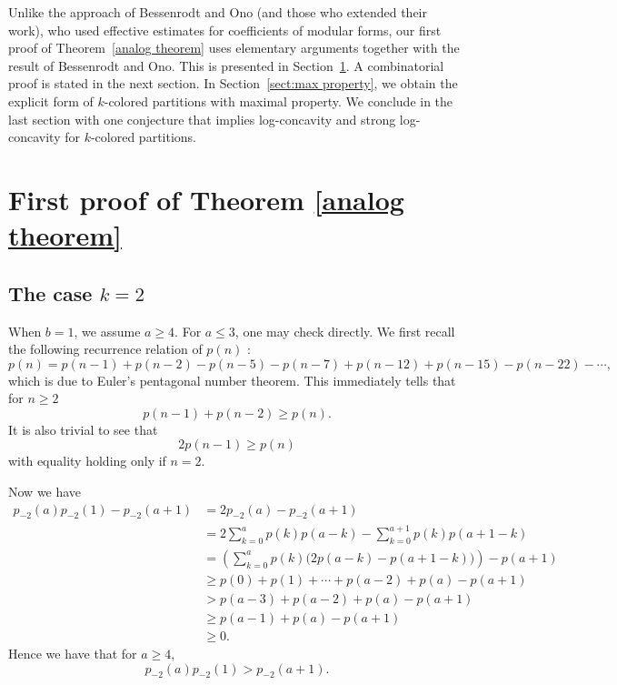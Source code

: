 \documentclass[12pt,reqno]{amsart}
\numberwithin{equation}{section}
\theoremstyle{plain}
\theoremstyle{definition}
\begin{document}
Unlike the approach of Bessenrodt and Ono (and those who extended their work), who used effective estimates for coefficients of modular forms, our first proof of Theorem~\ref{analog theorem} uses elementary arguments together with the result of Bessenrodt and Ono. This is presented in Section~\ref{sect:1st proof}. A combinatorial proof is stated in the next section. In Section~\ref{sect:max property}, we obtain the explicit form of $k$-colored partitions with maximal property. We conclude in the last section with one conjecture that implies log-concavity and strong log-concavity for $k$-colored partitions.


\section{First proof of Theorem \ref{analog theorem}}\label{sect:1st proof}

\subsection{The case $k=2$}


When $b=1$, we assume $a\ge 4$. For $a\le 3$, one may check directly. We first recall the following recurrence relation of $p(n)$ \cite[p. 12, Corollary 1.8]{Andr1976}:
$$p(n)=p(n-1)+p(n-2)-p(n-5)-p(n-7)+p(n-12)+p(n-15)-p(n-22)-\cdots,$$
which is due to Euler's pentagonal number theorem. This immediately tells that for $n\ge 2$
$$p(n-1)+p(n-2)\ge p(n).$$
It is also trivial to see that
$$2p(n-1)\ge p(n)$$
with equality holding only if $n=2$.

Now we have
\begin{align*}
p_{-2}(a)p_{-2}(1)-p_{-2}(a+1)&=2p_{-2}(a)-p_{-2}(a+1)\\
&=2\sum_{k=0}^a p(k)p(a-k)-\sum_{k=0}^{a+1}p(k)p(a+1-k)\\
&=\left(\sum_{k=0}^a p(k)\big(2p(a-k)-p(a+1-k)\big)\right)-p(a+1)\\
&\ge p(0)+p(1)+\cdots+p(a-2)+p(a)-p(a+1)\\
&> p(a-3)+p(a-2)+p(a)-p(a+1)\\
&\ge p(a-1)+p(a)-p(a+1)\\
&\ge 0.
\end{align*}
Hence we have that for $a\ge 4$,
$$p_{-2}(a)p_{-2}(1)>p_{-2}(a+1).$$
\end{document}
